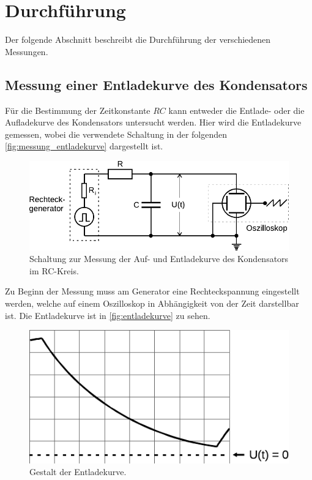 \section{Durchführung}
\label{sec:durchfuehrung}

    Der folgende Abschnitt beschreibt die Durchführung der verschiedenen Messungen.

\subsection{Messung einer Entladekurve des Kondensators}

    Für die Bestimmung der Zeitkonstante $RC$ kann entweder die Entlade- oder die Aufladekurve des Kondensators untersucht werden.
    Hier wird die Entladekurve gemessen,
    wobei die verwendete Schaltung in der folgenden \autoref{fig:messung_entladekurve} dargestellt ist.

    \begin{figure}[H]
        \centering
        \includegraphics{content/img/Abb_3.pdf}
        \caption{Schaltung zur Messung der Auf- und Entladekurve des Kondensators im RC-Kreis. \cite{versuchsanleitung}}
        \label{fig:messung_entladekurve}
    \end{figure}

    Zu Beginn der Messung muss am Generator eine Rechteckspannung eingestellt werden,
    welche auf einem Oszilloskop in Abhängigkeit von der Zeit darstellbar ist.
    Die Entladekurve ist in \autoref{fig:entladekurve} zu sehen.

    \begin{figure}
        \centering
        \includegraphics{content/img/Abb_4.pdf}
        \caption{Gestalt der Entladekurve. \cite{versuchsanleitung}}
        \label{fig:entladekurve}
    \end{figure}

